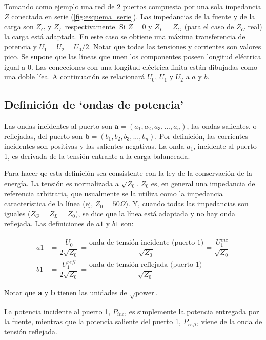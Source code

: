Tomando como ejemplo una red de 2 puertos compuesta por una sola impedancia $Z$ conectada en serie (\ref{fig:esquema_serie}).
Las impedancias de la fuente y de la carga son $Z_G$ y $Z_L$ respectivamente. Si $Z=0$ y $Z_L = Z_G$ (para el caso de $Z_G$ real) 
la carga está adaptada. En este caso se obtiene una máxima transferencia de potencia y $U_1 = U_2 = U_0/2$. Notar que todas las
tensiones y corrientes son valores pico. Se supone que las líneas que unen los componentes poseen longitud eléctrica igual a 0. 
Las conecciones con una longitud eléctrica finita están dibujadas como una doble líea. A continuación se relacionará $U_0$, $U_1$ 
y $U_2$ a $a$ y $b$.


\subsection{Definición de \enquote*{ondas de potencia}}

Las ondas incidentes al puerto son $\textbf{a}=(a_1, a_2, a_3, ..., a_n)$, las ondas salientes, o reflejadas, del puerto son  
$\textbf{b}=(b_1, b_2, b_3, ..., b_n)$. Por definición, las corrientes incidentes son positivas y las salientes negativas. La
onda $a_1$, incidente al puerto 1, es derivada de la tensión entrante a la carga balanceada. 

Para hacer qe esta definición sea consistente con la ley de la conservación de la energía. La tensión es normalizada a $\sqrt{Z_0}$. 
$Z_0$ es, en general una impedancia de referencia arbitraria, que usualmente se la utiliza como la impedancia característica de la 
línea (ej, $Z_0 = 50 \Omega$). Y, cuando todas las impedancias son iguales ($Z_G = Z_L = Z_0$), se dice que la línea está adaptada
y no hay onda reflejada. Las definiciones de $a1$ y $b1$ son:

\begin{equation}
\begin{aligned}
	a1 &= \dfrac{U_0}{2\sqrt{Z_0}}= \dfrac{\textrm{onda de tensión incidente (puerto 1)}}{\sqrt{Z_0}}=\dfrac{U_1^{inc}}{\sqrt{Z_0}} \\
	b1 &= \dfrac{U_1^{refl}}{2\sqrt{Z_0}}= \dfrac{\textrm{onda de tensión reflejada (puerto 1)}}{\sqrt{Z_0}}
\end{aligned}
\end{equation}

Notar que \textbf{a} y \textbf{b} tienen las unidades de $\sqrt{\textrm{power}}$.

La potencia incidente al puerto 1, $P_{inc}$, es simplemente la potencia entregada por la fuente, mientras que la potencia saliente 
del puerto 1, $P_{refl}$, viene de la onda de tensión reflejada.

